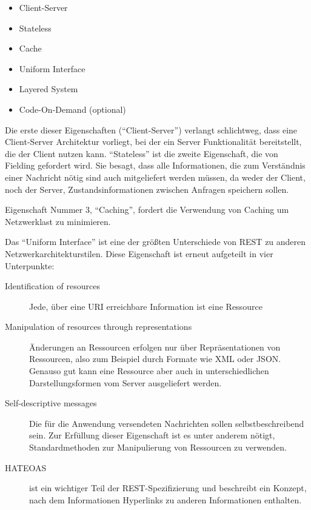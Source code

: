 \documentclass[12pt,a4paper,bibliography=totocnumbered,listof=totocnumbered]{scrartcl}
\begin{document}
\begin{itemize}
	\item Client-Server
	\item Stateless
	\item Cache
	\item Uniform Interface
	\item Layered System
	\item Code-On-Demand (optional)
\end{itemize}

Die erste dieser Eigenschaften (\enquote{Client-Server}) verlangt schlichtweg, dass eine Client-Server Architektur vorliegt, bei der ein Server Funktionalität bereitstellt, die der Client nutzen kann.
\enquote{Stateless} ist die zweite Eigenschaft, die von Fielding gefordert wird. Sie besagt, dass alle Informationen, die zum Verständnis einer Nachricht nötig sind auch mitgeliefert werden müssen, da weder der Client, noch der Server, Zustandsinformationen zwischen Anfragen speichern sollen.

Eigenschaft Nummer 3, \enquote{Caching}, fordert die Verwendung von Caching um Netzwerklast zu minimieren.

Das \enquote{Uniform Interface} ist eine der größten Unterschiede von REST zu anderen Netzwerkarchitekturstilen. Diese Eigenschaft ist erneut aufgeteilt in vier Unterpunkte:

\begin{description}  
	\item [Identification of resources] Jede, über eine URI erreichbare Information ist eine Ressource
	\item [Manipulation of resources through representations] Änderungen an Ressourcen erfolgen nur über Repräsentationen von Ressourcen, also zum Beispiel durch Formate wie XML oder JSON. Genauso gut kann eine Ressource aber auch in unterschiedlichen Darstellungsformen vom Server ausgeliefert werden.
	\item [Self-descriptive messages] Die für die Anwendung versendeten Nachrichten sollen selbstbeschreibend sein. Zur Erfüllung dieser Eigenschaft ist es unter anderem nötigt, Standardmethoden zur Manipulierung von Ressourcen zu verwenden.
	\item [\acf{HATEOAS}] ist ein wichtiger Teil der REST-Spezifizierung und beschreibt ein Konzept, nach dem Informationen Hyperlinks zu anderen Informationen enthalten. 
\end{description}

\end{document}
